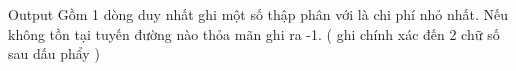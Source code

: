 Output
Gồm 1 dòng duy nhất ghi một số thập phân với là chi phí nhỏ nhất. Nếu không tồn tại tuyến đường nào thỏa mãn ghi ra -1. ( ghi chính xác đến 2 chữ số sau dấu phẩy )